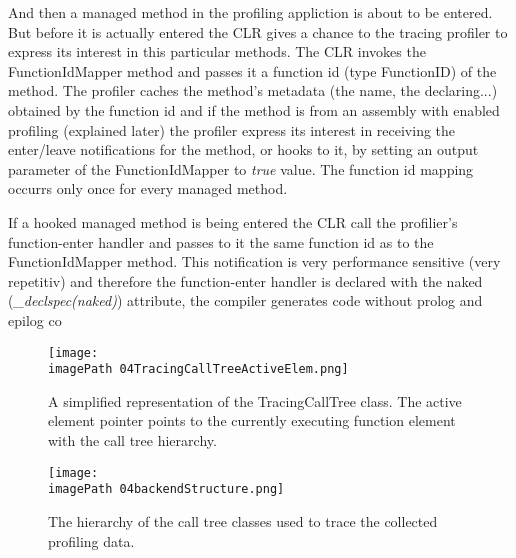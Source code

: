 And then a managed method in the profiling appliction is about to be entered. But before it is actually entered the CLR gives a chance to the tracing profiler to express its interest in this particular methods. The CLR invokes the FunctionIdMapper method and passes it a function id (type FunctionID) of the method. The profiler caches the method's metadata (the name, the declaring...) obtained by the function id and if the method is from an assembly with enabled profiling (explained later) the profiler express its interest in receiving the enter/leave notifications for the method,  or hooks to it, by setting an output parameter of the FunctionIdMapper to \textit{true} value. The function id mapping occurrs only once for every managed method.

If a hooked managed method is being entered the CLR call the profilier's function-enter handler and passes to it the same function id as to the FunctionIdMapper method. This notification is very performance sensitive (very repetitiv) and therefore the function-enter handler is declared with the naked (\textit{_declspec(naked)}) attribute, the compiler generates code without prolog and epilog co




\begin{figure}
	\centering
		\texttt{[image: \\imagePath 04TracingCallTreeActiveElem.png]}
		\caption{A simplified representation of the TracingCallTree class. The active element pointer points to the currently executing function element with the call tree hierarchy. }
	\label{fig:04TracingCallTreeActiveElem}
\end{figure}













\begin{figure}
	\centering
		\texttt{[image: \\imagePath 04backendStructure.png]}
		\caption{The hierarchy of the call tree classes used to trace the collected profiling data.}
	\label{fig:04backendStructure}
\end{figure}

